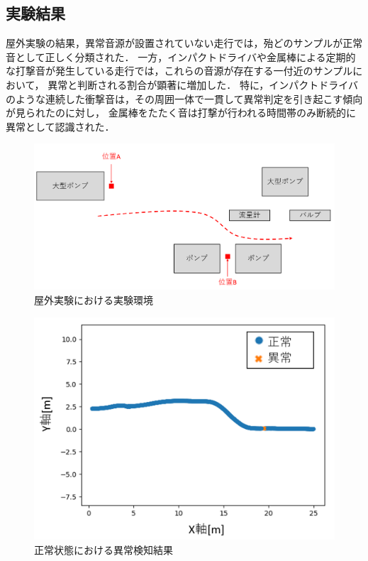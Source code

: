 \documentclass[../main]{subfiles}
\begin{document}
\subsection{実験結果}
\label{subsec:vexp_ci_result}
屋外実験の結果，異常音源が設置されていない走行では，殆どのサンプルが正常音として正しく分類された．
一方，インパクトドライバや金属棒による定期的な打撃音が発生している走行では，これらの音源が存在する一付近のサンプルにおいて，
異常と判断される割合が顕著に増加した．
特に，インパクトドライバのような連続した衝撃音は，その周囲一体で一貫して異常判定を引き起こす傾向が見られたのに対し，
金属棒をたたく音は打撃が行われる時間帯のみ断続的に異常として認識された．

\begin{figure}[t]
  \centering
  \includegraphics[keepaspectratio, width=1.0\linewidth]{chap4/field_environment.png}
  \caption{屋外実験における実験環境}
  \label{fig:field_environment}
\end{figure}

\begin{figure}[t]
  \centering
  \includegraphics[keepaspectratio, width=0.7\linewidth]{chap4/field_normal.png}
  \caption{正常状態における異常検知結果}
  \label{fig:field_normal}
\end{figure}
\end{document}
